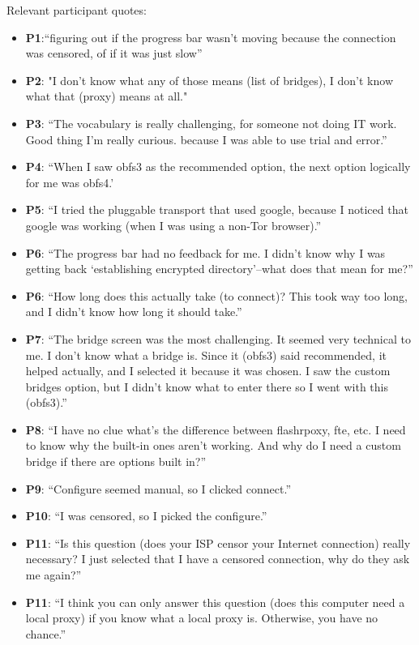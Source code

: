 \documentclass{template}
\begin{document}
Relevant participant quotes: 
\begin{itemize} \itemsep1pt \parskip0pt 
\item{{\bfseries P1}:``figuring out if the progress bar wasn't moving because the connection was censored, of if it was just slow''}
\item{{\bfseries P2}: "I don't know what any of those means (list of bridges), I don't know what that (proxy) means at all."}
\item{{\bfseries P3}: ``The vocabulary is really challenging, for someone not doing IT work. Good thing I'm really curious. because I was able to use trial and error.''} 
\item{{\bfseries P4}: ``When I saw obfs3 as the recommended option, the next option logically for me was obfs4.'}
\item{{\bfseries P5}: ``I tried the pluggable transport that used google, because I noticed that google was working (when I was using a non-Tor browser).''}
\item{{\bfseries P6}: ``The progress bar had no feedback for me. I didn't know why I was getting back `establishing encrypted directory'--what does that mean for me?''}
\item{{\bfseries P6}: ``How long does this actually take (to connect)? This took way too long, and I didn't know how long it should take.''}
\item{{\bfseries P7}: ``The bridge screen was the most challenging. It seemed very technical to me. I don't know what a bridge is. Since it (obfs3) said recommended, it helped actually, and I selected it because it was chosen. I saw the custom bridges option, but I didn't know what to enter there so I went with this (obfs3).''}
\item{{\bfseries P8}: ``I have no clue what's the difference between flashrpoxy, fte, etc. I need to know why the built-in ones aren't working. And why do I need a custom bridge if there are options built in?''}
\item{{\bfseries P9}: ``Configure seemed manual, so I clicked connect.''} %
\item{{\bfseries P10}: ``I was censored, so I picked the configure.''} %
\item{{\bfseries P11}: ``Is this question (does your ISP censor your Internet connection) really necessary? I just selected that I have a censored connection, why do they ask me again?''}
\item{{\bfseries P11}: ``I think you can only answer this question (does this computer need a local proxy) if you know what a local proxy is. Otherwise, you have no chance.''}

\end{itemize}
\end{document}
